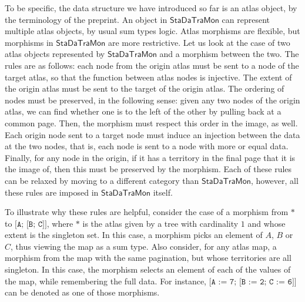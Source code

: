 \documentclass[11pt]{article}
\newcommand{\code}[1]{\texttt{#1}}
\newcommand{\StaDaTraMon}{\mathsf{StaDaTraMon}}
\begin{document}
To be specific, the data structure we have introduced so far is an atlas
object, by the terminology of the preprint. An object in
\(\StaDaTraMon\) can represent multiple atlas objects, by usual sum types
logic. Atlas morphisms are flexible, but morphisms in \(\StaDaTraMon\) are
more restrictive. Let us look at the case of two atlas objects represented
by \(\StaDaTraMon\) and a morphism between the two. The rules are as follows:
each node from the origin atlas must be sent to a node of the target atlas,
so that the function between atlas nodes is injective. The extent of the
origin atlas must be sent to the target of the origin atlas. The ordering of
nodes must be preserved, in the following sense: given any two nodes of the
origin atlas, we can find whether one is to the left of the other by pulling
back at a common page. Then, the morphism must respect this order in the
image, as well. Each origin node sent to a target node must induce an
injection between the data at the two nodes, that is, each node is sent to a
node with more or equal data. Finally, for any node in the origin, if it has
a territory in the final page that it is the image of, then this must be
preserved by the morphism. Each of these rules can be relaxed by moving to a
different category than \(\StaDaTraMon\), however, all these rules are
imposed in \(\StaDaTraMon\) itself.

To illustrate why these rules are helpful, consider the case of a morphism
from \(\code{*}\) to \(\code{[A; [B; C]]}\), where \(\code{*}\) is the
atlas given by a tree with cardinality \(1\) and whose extent is the
singleton set. In this case, a morphism picks an element of \(A\), \(B\) or
\(C\), thus viewing the map as a sum type. Also consider, for any atlas map,
a morphism from the map with the same pagination, but whose territories are
all singleton. In this case, the morphism selects an element of each of the
values of the map, while remembering the full data. For instance,
\(\code{[A := 7; [B := 2; C := 6]]}\) can be denoted as one of those
morphisms.
\end{document}
